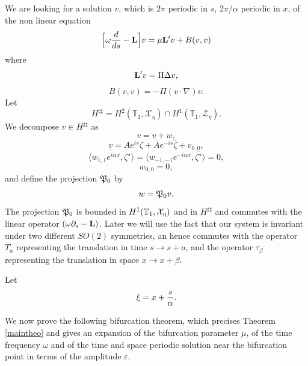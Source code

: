 \documentclass[11pt]{article}
\begin{document}
We are looking for a solution $v$, which is $2 \pi$ periodic in $s$, 
$2 \pi / \alpha$ periodic in $x$, of the non linear equation
\begin{equation} \label{4}
\Bigl[ \omega {d \over ds} - {\bf L} \Bigr] v = \mu {\bf L}' v
+ B(v,v)
\end{equation}
where
$$
{\bf L}' v = \Pi \Delta v,
$$
$$
B(v,v) = - \Pi (v \cdot \nabla) v.
$$
Let
$$
H^{\sharp\sharp} = H^2(\mathbb{T}_1,\mathcal{X}_\eta)
\cap H^1(\mathbb{T}_1, \mathcal{Z}_\eta).
$$
We decompose $v \in H^{\sharp\sharp}$ as
$$
v = \underline{v} + w,
$$
$$
\underline{v} = A e^{i s } \zeta + \overline{A} e^{- i s } \bar \zeta + v_{0,0},
$$
$$
\langle w_{1,1} e^{i \alpha x}, \zeta^{\star} \rangle
= \langle w_{-1,-1} e^{- i \alpha x}, \overline{\zeta^\star} \rangle = 0,
$$
$$
w_{0,0} = 0,
$$
and define the projection $\frak{P}_0$ by
$$
w = \frak{P}_0 v.
$$
The projection $\frak{P}_0$ is bounded in $H^1(\mathbb{T}_1,{\cal X}_\eta)$
and in $H^{\sharp\sharp}$ and commutes with the linear operator $( \omega \partial_s - {\bf L})$. Later 
we will use the fact that our system is invariant under two different $SO(2)$ symmetries, an hence commutes
 with  the operator $T_a$ representing the translation in time 
$s \to s + a$, and the operator  $\tau_\beta$ representing the translation in space $ x \to x + \beta$.

Let 
$$
\xi = x + {s \over \alpha} .
$$


We now prove the following  bifurcation theorem, which precises Theorem \ref{maintheo} and gives an expansion 
of the bifurcation parameter $\mu$, of the time frequency $\omega$
and of  the time and space periodic solution near the bifurcation point in terms of
the amplitude $\varepsilon$.
\end{document}
